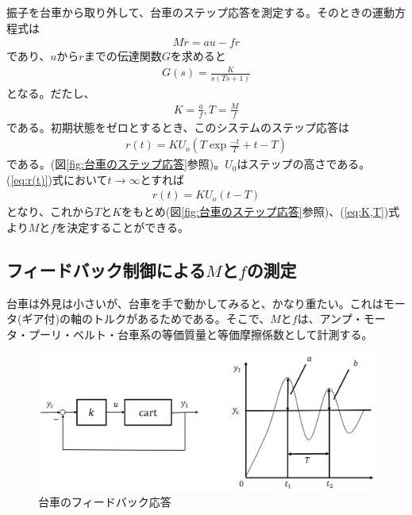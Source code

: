 \documentclass[a4j,11pt,twoside]{ujbook}
\begin{document}
	振子を台車から取り外して、台車のステップ応答を測定する。そのときの運動方程式は
	\begin{eqnarray*}
		M\ddot{r} = au - fr
	\end{eqnarray*}
	であり、$u$から$r$までの伝達関数$G$を求めると
	\begin{eqnarray*}
		G(s) = \frac{K}{s(Ts+1)}
	\end{eqnarray*}
	となる。だたし、
	\begin{eqnarray}
		K = \frac{a}{f},T = \frac{M}{f}
		\label{eq:K,T}
	\end{eqnarray}
	である。初期状態をゼロとするとき、このシステムのステップ応答は
	\begin{eqnarray}
		r(t) = KU_o(T\exp{\frac{-t}{T}}+t-T)
		\label{eq:r(t)}
	\end{eqnarray}
	である。(図\ref{fig:台車のステップ応答}参照)。$U_0$はステップの高さである。(\ref{eq:r(t)})式において$t→∞$とすれば
	\begin{eqnarray}
		r(t) = KU_o(t-T)
	\end{eqnarray}
	となり、これから$T$と$K$をもとめ(図\ref{fig:台車のステップ応答}参照)、(\ref{eq:K,T})式より$M$と$f$を決定することができる。

	\subsection{フィードバック制御による$M$と$f$の測定}
	台車は外見は小さいが、台車を手で動かしてみると、かなり重たい。これはモータ(ギア付)の軸のトルクがあるためである。そこで、$M$と$f$は、アンプ・モータ・プーリ・ベルト・台車系の等価質量と等価摩擦係数として計測する。

	\begin{figure}[htbp]
		\begin{center}
			\includegraphics[width=1.0\linewidth]{feedback.eps}
			\caption{台車のフィードバック応答}
			\label{fig:台車のフィードバック応答}
		\end{center}
	\end{figure}
\end{document}
